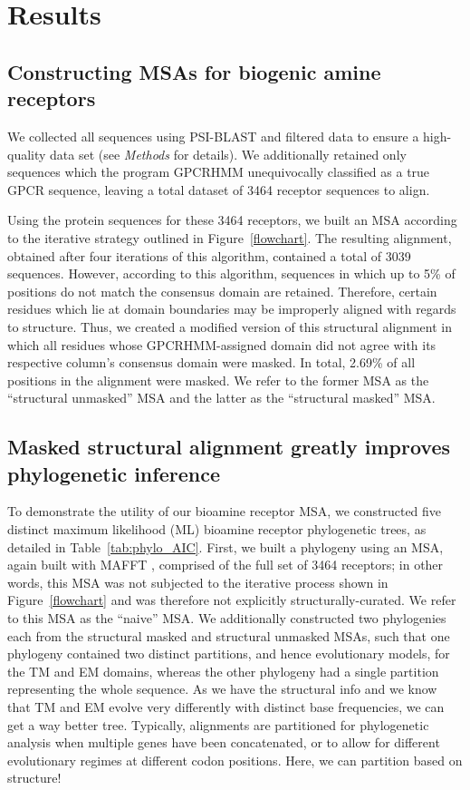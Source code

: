 \documentclass[fleqn,10pt]{wlpeerj}
\begin{document}
\section*{Results}

\subsection*{Constructing MSAs for biogenic amine receptors}
We collected all sequences using PSI-BLAST and filtered data to ensure a high-quality data set (see \emph{Methods} for details). We additionally retained only sequences which the program GPCRHMM unequivocally classified as a true GPCR sequence, leaving a total dataset of 3464 receptor sequences to align.

Using the protein sequences for these 3464 receptors, we built an MSA according to the iterative strategy outlined in Figure~\ref{flowchart}. The resulting alignment, obtained after four iterations of this algorithm, contained a total of 3039 sequences. However, according to this algorithm, sequences in which up to 5\% of positions do not match the consensus domain are retained. Therefore, certain residues which lie at domain boundaries may be improperly aligned with regards to structure. Thus, we created a modified version of this structural alignment in which all residues whose GPCRHMM-assigned domain did not agree with its respective column's consensus domain were masked. In total, 2.69\% of all positions in the alignment were masked. We refer to the former MSA as the ``structural unmasked'' MSA and the latter as the ``structural masked'' MSA.


\subsection*{Masked structural alignment greatly improves phylogenetic inference}

To demonstrate the utility of our bioamine receptor MSA, we constructed five distinct maximum likelihood (ML) bioamine receptor phylogenetic trees, as detailed in Table~\ref{tab:phylo_AIC}. 
First, we built a phylogeny using an MSA, again built with MAFFT \citep{mafftv7}, comprised of the full set of 3464 receptors; in other words, this MSA was not subjected to the iterative process shown in Figure~\ref{flowchart} and was therefore not explicitly structurally-curated. We refer to this MSA as the ``naive'' MSA. We additionally constructed two phylogenies each from the structural masked and structural unmasked MSAs, such that one phylogeny contained two distinct partitions, and hence evolutionary models, for the TM and EM domains, whereas the other phylogeny had a single partition representing the whole sequence. As we have the structural info and we know that TM and EM evolve very differently with distinct base frequencies, we can get a way better tree. Typically, alignments are partitioned for phylogenetic analysis when multiple genes have been concatenated, or to allow for different evolutionary regimes at different codon positions. Here, we can partition based on structure!
\end{document}
